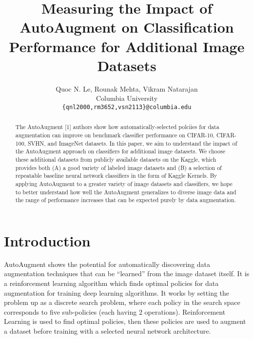 \documentclass[10pt,twocolumn,letterpaper]{article}
\begin{document}
\title{Measuring the Impact of AutoAugment on Classification Performance for Additional Image Datasets}

\author{Quoc N. Le, Rounak Mehta, Vikram Natarajan\\
Columbia University\\
{\tt\small \{qnl2000,rm3652,vsn2113\}@columbia.edu}
\\
}

\maketitle

\begin{abstract}
The AutoAugment [1] authors show how automatically-selected polciies for data augmentation can improve on benchmark classifier performance on CIFAR-10, CIFAR-100, SVHN, and ImageNet datasets.  In this paper, we aim to understand the impact of the AutoAugment approach on classifiers for additional image datasets. We choose these additional datasets from publicly available datasets on the Kaggle, which provides both (A) a good variety of labeled image datasets and (B) a selection of repeatable baseline neural network classifiers in the form of Kaggle Kernels.  By applying AutoAugment to a greater variety of image datasets and classifiers, we hope to better understand how well the AutoAugment generalizes to diverse image data and the range of performance increases that can be expected purely by data augmentation.    

\end{abstract}

\section{Introduction}

AutoAugment shows the potential for automatically discovering data augmentation techniques that can be “learned” from the image dataset itself. It is a reinforcement learning algorithm which finds optimal policies for data augmentation for training deep learning algorithms. It works by setting the problem up as a discrete search problem, where each policy in the search space corresponds to five sub-policies (each having 2 operations). Reinforcement Learning is used to find optimal policies, then these policies are used to augment a dataset before training with a selected neural network architecture. 
\end{document}
